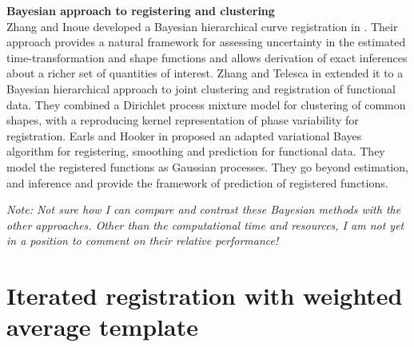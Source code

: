 \noindent
{\bf{Bayesian approach to registering and clustering}} \\
Zhang and Inoue developed a Bayesian hierarchical curve registration in \cite{Telesca_Inoue_2008_JASA}. Their approach provides a natural framework for assessing uncertainty in the estimated time-transformation and shape functions and allows derivation of exact inferences about a richer set of quantities of interest. Zhang and Telesca in \cite{Zhang_Telesca_2014_arXiv} extended it to a Bayesian hierarchical approach to joint clustering and registration of functional data. They combined a Dirichlet process mixture model for clustering of common shapes, with a reproducing kernel representation of phase variability for registration. Earls and Hooker in \cite{Earls_Hooker_2015_arXiv} proposed an adapted variational Bayes algorithm for registering, smoothing and prediction for functional data. They model the registered 
functions as Gaussian processes. They go beyond estimation, and inference and provide the framework of prediction of registered functions. 

{\emph{Note: Not sure how I can compare and contrast these Bayesian methods with the other approaches. Other than the computational time and resources, I am not yet in a position to comment on their relative performance!}}

\section{Iterated registration with weighted average template}
